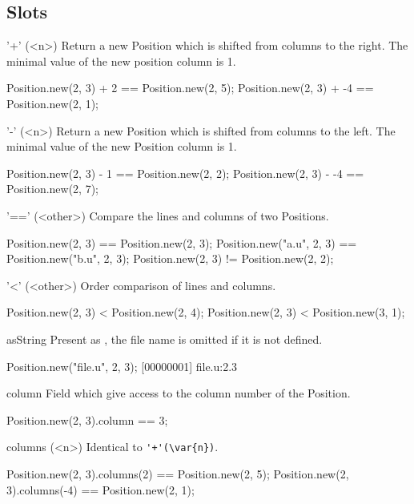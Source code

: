 \subsection{Slots}

\begin{urbiscriptapi}
\item['+'](<n>)%
  Return a new Position which is shifted from  columns to the
  right.  The minimal value of the new position column is 1.
\begin{urbiassert}
Position.new(2, 3) + 2 == Position.new(2, 5);
Position.new(2, 3) + -4 == Position.new(2, 1);
\end{urbiassert}

\item['-'](<n>)%
  Return a new Position which is shifted from  columns to the
  left.  The minimal value of the new Position column is 1.
\begin{urbiassert}
Position.new(2, 3) - 1 == Position.new(2, 2);
Position.new(2, 3) - -4 == Position.new(2, 7);
\end{urbiassert}

\item['=='](<other>)%
  Compare the lines and columns of two Positions.
\begin{urbiassert}
Position.new(2, 3) == Position.new(2, 3);
Position.new("a.u", 2, 3) == Position.new("b.u", 2, 3);
Position.new(2, 3) != Position.new(2, 2);
\end{urbiassert}

\item['<'](<other>)%
  Order comparison of lines and columns.
\begin{urbiassert}
Position.new(2, 3) < Position.new(2, 4);
Position.new(2, 3) < Position.new(3, 1);
\end{urbiassert}

\item[asString]
  Present as , the file name is
  omitted if it is not defined.
\begin{urbiscript}
Position.new("file.u", 2, 3);
[00000001] file.u:2.3
\end{urbiscript}

\item[column]
  Field which give access to the column number of the Position.
\begin{urbiassert}
Position.new(2, 3).column == 3;
\end{urbiassert}

\item[columns](<n>)%
  Identical to \lstinline|'+'(\var{n})|.
\begin{urbiassert}
Position.new(2, 3).columns(2) == Position.new(2, 5);
Position.new(2, 3).columns(-4) == Position.new(2, 1);
\end{urbiassert}


\end{urbiscriptapi}
